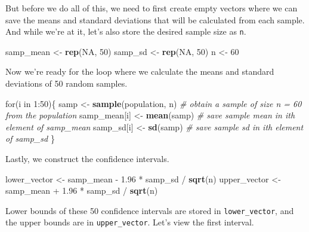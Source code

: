 \documentclass[]{book}
\newenvironment{Shaded}{\begin{snugshade}}{\end{snugshade}}
\newcommand{\KeywordTok}[1]{\textcolor[rgb]{0.13,0.29,0.53}{\textbf{{#1}}}}
\newcommand{\DecValTok}[1]{\textcolor[rgb]{0.00,0.00,0.81}{{#1}}}
\newcommand{\FloatTok}[1]{\textcolor[rgb]{0.00,0.00,0.81}{{#1}}}
\newcommand{\StringTok}[1]{\textcolor[rgb]{0.31,0.60,0.02}{{#1}}}
\newcommand{\CommentTok}[1]{\textcolor[rgb]{0.56,0.35,0.01}{\textit{{#1}}}}
\newcommand{\OtherTok}[1]{\textcolor[rgb]{0.56,0.35,0.01}{{#1}}}
\newcommand{\NormalTok}[1]{{#1}}
\theoremstyle{definition}
\theoremstyle{definition}
\theoremstyle{remark}
\begin{document}
But before we do all of this, we need to first create empty vectors
where we can save the means and standard deviations that will be
calculated from each sample. And while we're at it, let's also store the
desired sample size as \texttt{n}.

\begin{Shaded}
\begin{Highlighting}[]
\NormalTok{samp_mean <-}\StringTok{ }\KeywordTok{rep}\NormalTok{(}\OtherTok{NA}\NormalTok{, }\DecValTok{50}\NormalTok{)}
\NormalTok{samp_sd <-}\StringTok{ }\KeywordTok{rep}\NormalTok{(}\OtherTok{NA}\NormalTok{, }\DecValTok{50}\NormalTok{)}
\NormalTok{n <-}\StringTok{ }\DecValTok{60}
\end{Highlighting}
\end{Shaded}

Now we're ready for the loop where we calculate the means and standard
deviations of 50 random samples.

\begin{Shaded}
\begin{Highlighting}[]
\NormalTok{for(i in }\DecValTok{1}\NormalTok{:}\DecValTok{50}\NormalTok{)\{}
  \NormalTok{samp <-}\StringTok{ }\KeywordTok{sample}\NormalTok{(population, n) }\CommentTok{# obtain a sample of size n = 60 from the population}
  \NormalTok{samp_mean[i] <-}\StringTok{ }\KeywordTok{mean}\NormalTok{(samp)    }\CommentTok{# save sample mean in ith element of samp_mean}
  \NormalTok{samp_sd[i] <-}\StringTok{ }\KeywordTok{sd}\NormalTok{(samp)        }\CommentTok{# save sample sd in ith element of samp_sd}
\NormalTok{\}}
\end{Highlighting}
\end{Shaded}

Lastly, we construct the confidence intervals.

\begin{Shaded}
\begin{Highlighting}[]
\NormalTok{lower_vector <-}\StringTok{ }\NormalTok{samp_mean -}\StringTok{ }\FloatTok{1.96} \NormalTok{*}\StringTok{ }\NormalTok{samp_sd /}\StringTok{ }\KeywordTok{sqrt}\NormalTok{(n) }
\NormalTok{upper_vector <-}\StringTok{ }\NormalTok{samp_mean +}\StringTok{ }\FloatTok{1.96} \NormalTok{*}\StringTok{ }\NormalTok{samp_sd /}\StringTok{ }\KeywordTok{sqrt}\NormalTok{(n)}
\end{Highlighting}
\end{Shaded}

Lower bounds of these 50 confidence intervals are stored in
\texttt{lower\_vector}, and the upper bounds are in
\texttt{upper\_vector}. Let's view the first interval.
\end{document}
